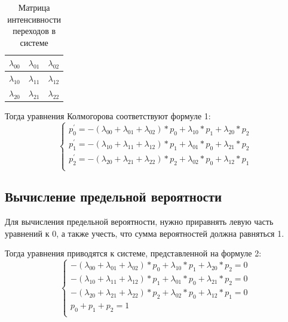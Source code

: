 \begin{table}[h]
	\caption{Матрица интенсивности переходов в системе}
	\centering
	\begin{tabular}{|c|c|c|}
		\hline
		$\lambda_{00}$ & $\lambda_{01}$ & $\lambda_{02}$ \\ \hline
		$\lambda_{10}$ & $\lambda_{11}$ & $\lambda_{12}$ \\ \hline
		$\lambda_{20}$ & $\lambda_{21}$ & $\lambda_{22}$ \\ \hline
	\end{tabular}
\end{table}


Тогда уравнения Колмогорова соответствуют формуле 1:
\begin{equation}
	\begin{cases}
		p^{'}_{0} = -(\lambda_{00}+\lambda_{01}+\lambda_{02})*p_0 + \lambda_{10}*p_1 + \lambda_{20}*p_2 \\
		p^{'}_{1} = -(\lambda_{10}+\lambda_{11}+\lambda_{12})*p_1 + \lambda_{01}*p_0 + \lambda_{21}*p_2 \\
		p^{'}_{2} = -(\lambda_{20}+\lambda_{21}+\lambda_{22})*p_2 + \lambda_{02}*p_0 + \lambda_{12}*p_1 \\
	\end{cases}
\end{equation}

\subsection*{Вычисление предельной вероятности}

Для вычисления предельной вероятности, нужно приравнять левую часть уравнений к 0, а также учесть, что сумма вероятностей должна равняться 1.

Тогда уравнения приводятся к системе, представленной на формуле 2:
\begin{equation}
	\begin{cases}
		-(\lambda_{00}+\lambda_{01}+\lambda_{02})*p_0 + \lambda_{10}*p_1 + \lambda_{20}*p_2  = 0\\
		-(\lambda_{10}+\lambda_{11}+\lambda_{12})*p_1 + \lambda_{01}*p_0 + \lambda_{21}*p_2 = 0 \\
		-(\lambda_{20}+\lambda_{21}+\lambda_{22})*p_2 + \lambda_{02}*p_0 + \lambda_{12}*p_1 = 0 \\
		p_{0} + p_{1} + p_{2} = 1 \\
  	\end{cases}
\end{equation}

